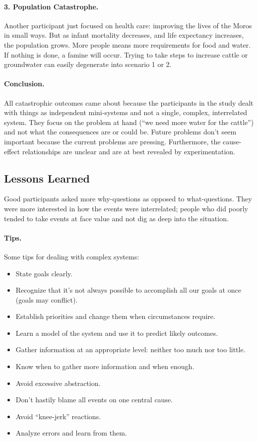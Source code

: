 \paragraph{3. Population Catastrophe.}
Another participant just focused on health care: improving the lives of the Moros in small ways. But as infant mortality decreases, and life expectancy increases, the population grows. More people means more requirements for food and water. If nothing is done, a famine will occur. Trying to take steps to increase cattle or groundwater can easily degenerate into scenario 1 or 2.

\paragraph{Conclusion.}
All catastrophic outcomes came about because the participants in the study dealt with things as independent mini-systems and not a single, complex, interrelated system. They focus on the problem at hand (``we need more water for the cattle'') and not what the consequences are or could be. Future problems don't seem important because the current problems are pressing. Furthermore, the cause-effect relationships are unclear and are at best revealed by experimentation.

\subsection*{Lessons Learned}

Good participants asked more why-questions as opposed to what-questions. They were more interested in how the events were interrelated; people who did poorly tended to take events at face value and not dig as deep into the situation.


\paragraph{Tips.}
 Some tips for dealing with complex systems:

\begin{itemize}
	\item State goals clearly.
	\item Recognize that it's not always possible to accomplish all our goals at once (goals may conflict).
	\item Establish priorities and change them when circumstances require.
	\item Learn a model of the system and use it to predict likely outcomes.
	\item Gather information at an appropriate level: neither too much nor too little.
	\item Know when to gather more information and when enough. 
	\item Avoid excessive abstraction.
	\item Don't hastily blame all events on one central cause.
	\item Avoid ``knee-jerk'' reactions.
	\item Analyze errors and learn from them.

\end{itemize}

